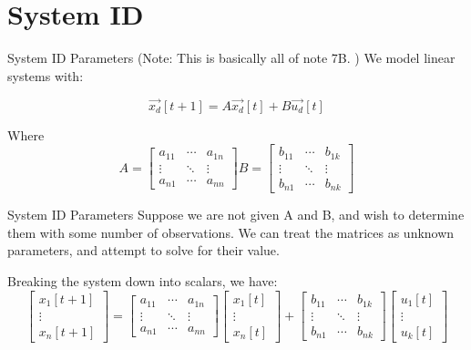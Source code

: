 \section{System ID}

\begin{frame}{System ID Parameters}
	(Note: This is basically all of note 7B. )
    We model linear systems with:

    \[
        \vec{x_d}[t+1] = A\vec{x_d}[t] + B\vec{u_d}[t]
    \]
        
    Where 
   	\[
		A = 
		\begin{bmatrix}
			a_{11} & \cdots & a_{1n} \\
			\vdots & \ddots & \vdots \\
			a_{n1} & \cdots & a_{nn}     
		\end{bmatrix}
		B = 
		\begin{bmatrix}
			b_{11} & \cdots & b_{1k} \\
			\vdots & \ddots & \vdots \\
			b_{n1} & \cdots & b_{nk}     
		\end{bmatrix}        
    \]
\end{frame}
	
\begin{frame}{System ID Parameters}
	Suppose we are not given A and B, and wish to determine them with some number of observations. We can treat the matrices as unknown parameters, and attempt to solve for their value. 
	
	Breaking the system down into scalars, we have:
	\[
		\begin{bmatrix}
			x_1[t+1] \\
			\vdots \\
			x_n[t+1] 
		\end{bmatrix}
		=
		\begin{bmatrix}
			a_{11} & \cdots & a_{1n} \\
			\vdots & \ddots & \vdots \\
			a_{n1} & \cdots & a_{nn}     
		\end{bmatrix}
		\begin{bmatrix}
			x_1[t] \\
			\vdots \\
			x_n[t] 
		\end{bmatrix}
		+
		\begin{bmatrix}
			b_{11} & \cdots & b_{1k} \\
			\vdots & \ddots & \vdots \\
			b_{n1} & \cdots & b_{nk}     
		\end{bmatrix}        
		\begin{bmatrix}
			u_1[t] \\
			\vdots \\
			u_k[t] 
		\end{bmatrix}
    \]
\end{frame}

